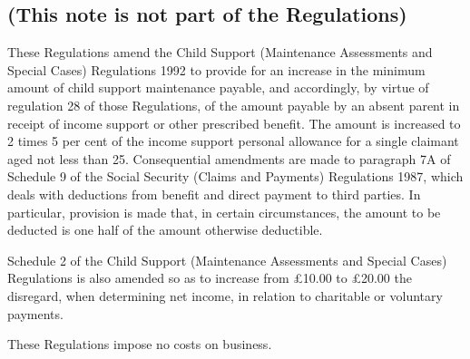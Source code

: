 \documentclass[a4paper]{article}
\newcommand{\parthead}{}
\begin{document}
\renewcommand\parthead{--- Explanatory Note}

\subsection*{(This note is not part of the Regulations)}

These Regulations amend the Child Support (Maintenance Assessments and Special Cases) Regulations 1992 to provide for an increase in the minimum amount of child support maintenance payable, and accordingly, by virtue of regulation 28 of those Regulations, of the amount payable by an absent parent in receipt of income support or other prescribed benefit. The amount is increased to 2 times 5 per cent of the income support personal allowance for a single claimant aged not less than 25. Consequential amendments are made to paragraph 7A of Schedule 9 of the Social Security (Claims and Payments) Regulations 1987, which deals with deductions from benefit and direct payment to third parties. In particular, provision is made that, in certain circumstances, the amount to be deducted is one half of the amount otherwise deductible.

  Schedule 2 of the Child Support (Maintenance Assessments and Special Cases) Regulations is also amended so as to increase from £10.00 to £20.00 the disregard, when determining net income, in relation to charitable or voluntary payments.

  These Regulations impose no costs on business.
\end{document}
